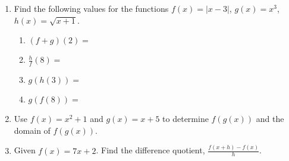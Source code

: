 



\begin{enumerate}

\item Find the following values for the functions $f(x)=|x-3|$, $g(x)=x^3$, $h(x)=\sqrt{x+1}$.
\begin{enumerate}
\item $(f+g)(2)=$
\vfill
\item $\displaystyle \frac{h}{f}(8)=$
\vfill
\item $g(h(3))=$
\vfill
\item $g(f(8))=$
\end{enumerate}



\vfill
\newpage

\item  Use $f(x)=x^2+1$ and $g(x)=x+5$ to determine $f(g(x))$ and the domain of $f(g(x))$.
\vfill



\item Given $f(x)=7x+2$.  Find the difference quotient, $\displaystyle \frac{f(x+h)-f(x)}{h}$.

\vfill






\end{enumerate}


